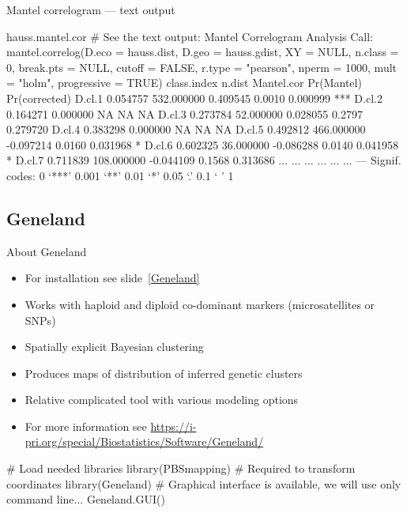 \documentclass[compress, ucs, xelatex, 11pt, xcolor=svgnames, aspectratio=169,
	hyperref={
		bookmarks=true,
		unicode=true,
		colorlinks=true,
		pdftitle={Molecular data in R},
		plainpages=false,
		pdfauthor={Vojtech Zeisek},
		pdfsubject={Course about phylogeny and evolution in R},
		pdfcreator={XeLaTeX},
		pdfkeywords={R, evolution, phylogeny, molecular data},
		linkcolor=Crimson, %
		anchorcolor=Magenta, %
		citecolor=Magenta, %
		filecolor=Magenta, %
		menucolor=Magenta, %
		urlcolor=DodgerBlue, %
		pdftex},
	url={hyphens, lowtilde} %
	]{beamer}
\begin{document}
\begin{frame}[fragile]{Mantel correlogram --- text output}
	\begin{spluscode}
    hauss.mantel.cor # See the text output:
    Mantel Correlogram Analysis
    Call:
    mantel.correlog(D.eco = hauss.dist, D.geo = hauss.gdist, XY = NULL,
     n.class = 0, break.pts = NULL, cutoff = FALSE, r.type = "pearson",
     nperm = 1000, mult = "holm", progressive = TRUE)
            class.index     n.dist Mantel.cor Pr(Mantel) Pr(corrected)
    D.cl.1     0.054757 532.000000   0.409545     0.0010      0.000999 ***
    D.cl.2     0.164271   0.000000         NA         NA            NA
    D.cl.3     0.273784  52.000000   0.028055     0.2797      0.279720
    D.cl.4     0.383298   0.000000         NA         NA            NA
    D.cl.5     0.492812 466.000000  -0.097214     0.0160      0.031968 *
    D.cl.6     0.602325  36.000000  -0.086288     0.0140      0.041958 *
    D.cl.7     0.711839 108.000000  -0.044109     0.1568      0.313686
       ...          ...        ...        ...        ...           ...
    ---
    Signif. codes:  0 ‘***’ 0.001 ‘**’ 0.01 ‘*’ 0.05 ‘.’ 0.1 ‘ ’ 1
	\end{spluscode}
\end{frame}

\subsection{Geneland}

\begin{frame}[fragile]{About Geneland}
	\label{GenelandUse}
	\begin{itemize}
		\item For installation see slide~\ref{Geneland}
		\item Works with haploid and diploid co-dominant markers (microsatellites or SNPs)
		\item Spatially explicit Bayesian clustering
		\item Produces maps of distribution of inferred genetic clusters
		\item Relative complicated tool with various modeling options
		\item For more information see \url{https://i-pri.org/special/Biostatistics/Software/Geneland/}
	\end{itemize}
	\vfill
	\begin{spluscode}
    # Load needed libraries
    library(PBSmapping) # Required to transform coordinates
    library(Geneland)
    # Graphical interface is available, we will use only command line...
    Geneland.GUI()
	\end{spluscode}
\end{frame}
\end{document}

